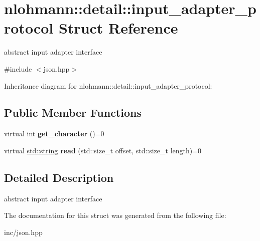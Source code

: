 \hypertarget{structnlohmann_1_1detail_1_1input__adapter__protocol}{}\section{nlohmann\+:\+:detail\+:\+:input\+\_\+adapter\+\_\+protocol Struct Reference}
\label{structnlohmann_1_1detail_1_1input__adapter__protocol}


abstract input adapter interface  




{\ttfamily \#include $<$json.\+hpp$>$}



Inheritance diagram for nlohmann\+:\+:detail\+:\+:input\+\_\+adapter\+\_\+protocol\+:
\subsection*{Public Member Functions}
\begin{DoxyCompactItemize}
\item 
virtual int {\bfseries get\+\_\+character} ()=0\hypertarget{structnlohmann_1_1detail_1_1input__adapter__protocol_af4e0baade0a6b45a73d4e136875e7544}{}\label{structnlohmann_1_1detail_1_1input__adapter__protocol_af4e0baade0a6b45a73d4e136875e7544}

\item 
virtual \hyperlink{namespacenlohmann_1_1detail_a90aa5ef615aa8305e9ea20d8a947980fab45cffe084dd3d20d928bee85e7b0f21}{std\+::string} {\bfseries read} (std\+::size\+\_\+t offset, std\+::size\+\_\+t length)=0\hypertarget{structnlohmann_1_1detail_1_1input__adapter__protocol_a9ce6c8028229446d7014c0610fbd4599}{}\label{structnlohmann_1_1detail_1_1input__adapter__protocol_a9ce6c8028229446d7014c0610fbd4599}

\end{DoxyCompactItemize}


\subsection{Detailed Description}
abstract input adapter interface 

The documentation for this struct was generated from the following file\+:\begin{DoxyCompactItemize}
\item 
inc/json.\+hpp\end{DoxyCompactItemize}
